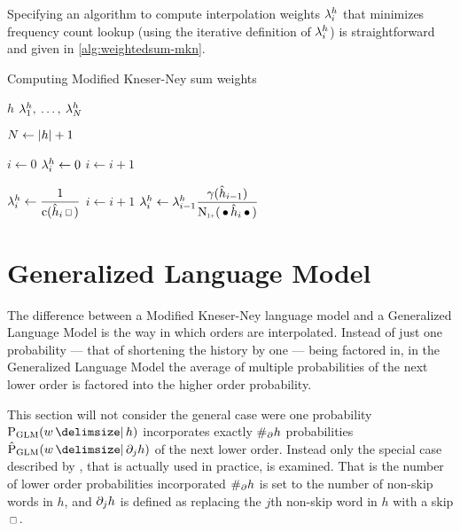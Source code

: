 Specifying an algorithm to compute interpolation weights $\lambda_i^h$ that
minimizes frequency count lookup (using the iterative definition of
$\lambda_i^h$) is straightforward and given in \cref{alg:weightedsum-mkn}.

\begin{algorithm}
  \caption{Computing Modified Kneser-Ney sum weights}
  \label{alg:weightedsum-mkn}
  \begin{algorithmic}[1]
    \Require $h$
    \Ensure $\lambda_1^h, \: \ldots, \: \lambda_N^h$

    \State $N \gets {\left|h\right|} + 1$

    \vspace{0.7em}
    \State $i \gets 0$
      \State $\lambda_i^h \gets 0$
      \State $i \gets i + 1$
    \EndWhile

    \vspace{0.7em}
    \State $\SumWeight_i^h \gets \dfrac{1}{\Count(\DerivedHistory[i] \Skp)}$
      \State $i \gets i + 1$
      \State $\SumWeight_i^h \gets \SumWeight_{i-1}^h \dfrac{\gamma(\DerivedHistory[i-1])}{\ContCountIp(\WSkp \DerivedHistory[i] \WSkp)}$
    \EndWhile
  \end{algorithmic}
\end{algorithm}


\section{Generalized Language Model}

The difference between a Modified Kneser-Ney language model and a
Generalized Language Model is the way in which orders are interpolated.
Instead of just one probability --- that of shortening the history by one ---
being factored in, in the Generalized Language Model the average of multiple
probabilities of the next lower order is factored into the higher order
probability.

This section will not consider the general case were one probability
$\ProbGLM{w}{h}$ incorporates exactly $\NumSkpOp{h}$ probabilities
$\ProbGLM*{w}{\SkpOp[j]{h}}$ of the next lower order.
Instead only the special case described by \textcite{Pickhardt2014}, that is
actually used in practice, is examined.
That is the number of lower order probabilities incorporated $\NumSkpOp{h}$
is set to the number of non-skip words in $h$, and $\SkpOp[j]{h}$ is defined as
replacing the $j$th non-skip word in $h$ with a skip $\Skp$.

